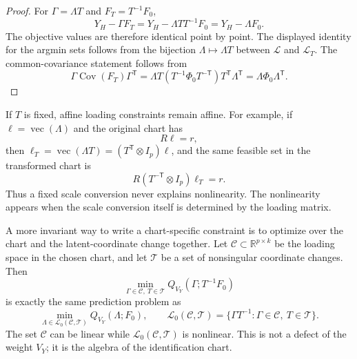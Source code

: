 \documentclass[11pt]{article}
\newcommand{\T}{^{\mathsf T}}
\newcommand{\Cov}{\operatorname{Cov}}
\theoremstyle{plain}
\theoremstyle{remark}
\begin{document}
\begin{proof}
For \(\Gamma=\Lambda T\) and \(F_T=T^{-1}F_0\),
\[
  Y_H-\Gamma F_T=Y_H-\Lambda T T^{-1}F_0=Y_H-\Lambda F_0 .
\]
The objective values are therefore identical point by point. The displayed
identity for the argmin sets follows from the bijection
\(\Lambda\mapsto\Lambda T\) between \(\mathcal L\) and \(\mathcal L_T\). The
common-covariance statement follows from
\[
  \Gamma\Cov(F_T)\Gamma\T
  =
  \Lambda T(T^{-1}\Phi_0T^{-\mathsf T})T\T\Lambda\T
  =
  \Lambda\Phi_0\Lambda\T .
\]
\end{proof}

If \(T\) is fixed, affine loading constraints remain affine. For example, if
\(\ell=\operatorname{vec}(\Lambda)\) and the original chart has
\[
  R\ell=r,
\]
then \(\ell_T=\operatorname{vec}(\Lambda T)=(T\T\otimes I_p)\ell\), and the
same feasible set in the transformed chart is
\[
  R(T^{-\mathsf T}\otimes I_p)\ell_T=r .
\]
Thus a fixed scale conversion never explains nonlinearity. The nonlinearity
appears when the scale conversion itself is determined by the loading matrix.

A more invariant way to write a chart-specific constraint is to optimize over
the chart and the latent-coordinate change together. Let
\(\mathcal C\subset\mathbb R^{p\times k}\) be the loading space in the chosen
chart, and let \(\mathcal T\) be a set of nonsingular coordinate changes. Then
\[
  \min_{\Gamma\in\mathcal C,\ T\in\mathcal T}
    Q_{V_Y}(\Gamma;T^{-1}F_0)
\]
is exactly the same prediction problem as
\[
  \min_{\Lambda\in\mathcal L_0(\mathcal C,\mathcal T)}
    Q_{V_Y}(\Lambda;F_0),
  \qquad
  \mathcal L_0(\mathcal C,\mathcal T)
  =
  \{\Gamma T^{-1}:\Gamma\in\mathcal C,\ T\in\mathcal T\}.
\]
The set \(\mathcal C\) can be linear while
\(\mathcal L_0(\mathcal C,\mathcal T)\) is nonlinear. This is not a defect of
the weight \(V_Y\); it is the algebra of the identification chart.
\end{document}
